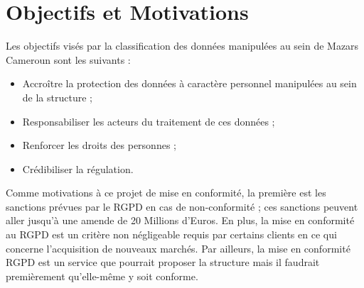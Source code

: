 \section{Objectifs et Motivations}

Les objectifs visés par la classification des données manipulées au sein de Mazars Cameroun sont les suivants :
\begin{itemize}
  \item Accroître la protection des données à caractère personnel manipulées au sein de la structure ;
  \item Responsabiliser les acteurs du traitement de ces données ;
  \item Renforcer les droits des personnes ;
  \item Crédibiliser la régulation.
\end{itemize}

Comme motivations à ce projet de mise en conformité, la première est les sanctions prévues par le RGPD en cas de non-conformité ; ces sanctions peuvent aller jusqu’à une amende de 20 Millions d’Euros. En plus, la mise en conformité au RGPD est un critère non négligeable requis par certains clients en ce qui concerne l’acquisition de nouveaux marchés. Par ailleurs, la mise en conformité RGPD est un service que pourrait proposer la structure mais il faudrait premièrement qu’elle-même y soit conforme. 